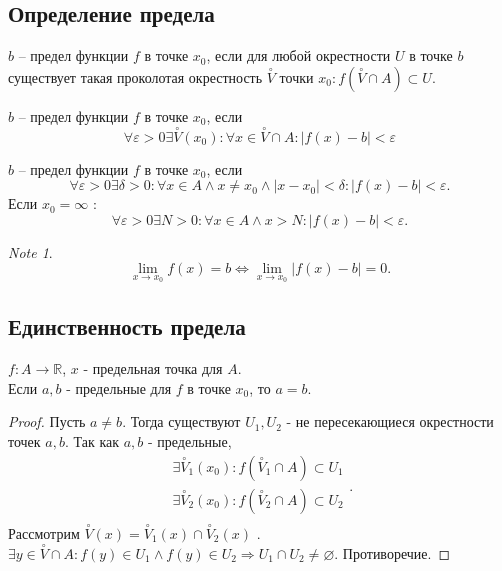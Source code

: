 \documentclass[11pt]{book}
\newcommand{\R}{\mathbb{R}}
\theoremstyle{definition}
\theoremstyle{plain}
\theoremstyle{plain}
\theoremstyle{definition}
\theoremstyle{remark}
\newtheorem*{note}{Note}
\begin{document}
\subsection{Определение предела}\label{ques_14}
\begin{defn}
    $b$ -- предел функции $f$ в точке  $x_0$, если для любой окрестности  $U$ в точке $b$ существует такая проколотая окрестность $\stackrel{\circ} V$ точки $x_0: f(\stackrel{\circ} V\cap A) \subset U$.
\end{defn}
\begin{defn}
    $b$ -- предел функции $f$ в точке  $x_0$, если
    $$\forall \varepsilon >0 \exists \stackrel{\circ} V (x_0): \forall x \in  \stackrel{\circ} V \cap A: |f(x)-b| < \varepsilon  $$
\end{defn}
\begin{defn}
    $b$ -- предел функции $f$ в точке  $x_0$, если
    \[
	\forall \varepsilon >0 \exists \delta >0 :\forall x \in A \wedge x \ne x_0 \wedge |x-x_0|<\delta : |f(x)-b| < \varepsilon 
    .\] 
    Если $x_0 = \infty$ :
    \[
	\forall \varepsilon >0 \exists N >0 :\forall x \in A \wedge x > N : |f(x)-b| < \varepsilon 
    .\] 
\end{defn}
\begin{note}
    \[
	\lim \limits_{x \to x_0} f(x) = b \Longleftrightarrow \lim \limits_{x \to x_0} |f(x) -b|=0
    .\] 
\end{note}
\subsection{Единственность предела}\label{ques_15}
\begin{thm}
    $f : A \to \R$, $x$ - предельная точка для $A$.\\
    Если $a, b$ - предельные для $f$ в точке $x_0$, то $a=b$.
\end{thm}
\begin{proof}
    Пусть $a\ne b$. Тогда существуют $U_1 , U_2$ - не пересекающиеся окрестности точек $a, b$. Так как $a, b$ - предельные, \[
	\begin{array}{c}
	    \exists \stackrel{\circ} V_1 (x_0): f(\stackrel{\circ} V_1 \cap A) \subset U_1 \\
	    \exists \stackrel{\circ} V_2 (x_0): f(\stackrel{\circ} V_2 \cap A) \subset U_2 \\
    \end{array}
    .\] 
    Рассмотрим $\stackrel{\circ} V(x) = \stackrel{\circ} V_1(x) \cap \stackrel{\circ} V_2(x)$ . $\exists y \in  \stackrel{\circ}V \cap A: f(y) \in  U_1 \wedge f(y) \in  U_2 \Rightarrow U_1 \cap U_2 \ne \varnothing$. Противоречие. 
\end{proof}
\end{document}
